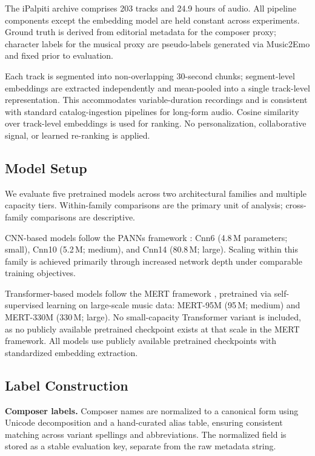 \documentclass[sigconf]{acmart}
\begin{document}
The iPalpiti archive comprises 203 tracks and 24.9 hours of audio. All pipeline components except the embedding model are held constant across experiments. Ground truth is derived from editorial metadata for the composer proxy; character labels for the musical proxy are pseudo-labels generated via Music2Emo and fixed prior to evaluation.

Each track is segmented into non-overlapping 30-second chunks; segment-level embeddings are extracted independently and mean-pooled into a single track-level representation. This accommodates variable-duration recordings and is consistent with standard catalog-ingestion pipelines for long-form audio. Cosine similarity over track-level embeddings is used for ranking. No personalization, collaborative signal, or learned re-ranking is applied.

\subsection{Model Setup}

We evaluate five pretrained models across two architectural families and multiple capacity tiers. Within-family comparisons are the primary unit of analysis; cross-family comparisons are descriptive.

CNN-based models follow the PANNs framework \cite{kong2020panns}: Cnn6 (4.8\,M parameters; small), Cnn10 (5.2\,M; medium), and Cnn14 (80.8\,M; large). Scaling within this family is achieved primarily through increased network depth under comparable training objectives.

Transformer-based models follow the MERT framework \cite{li2023mert}, pretrained via self-supervised learning on large-scale music data: MERT-95M (95\,M; medium) and MERT-330M (330\,M; large). No small-capacity Transformer variant is included, as no publicly available pretrained checkpoint exists at that scale in the MERT framework. All models use publicly available pretrained checkpoints with standardized embedding extraction.

\subsection{Label Construction}

\textbf{Composer labels.} Composer names are normalized to a canonical form using Unicode decomposition and a hand-curated alias table, ensuring consistent matching across variant spellings and abbreviations. The normalized field is stored as a stable evaluation key, separate from the raw metadata string.
\end{document}
